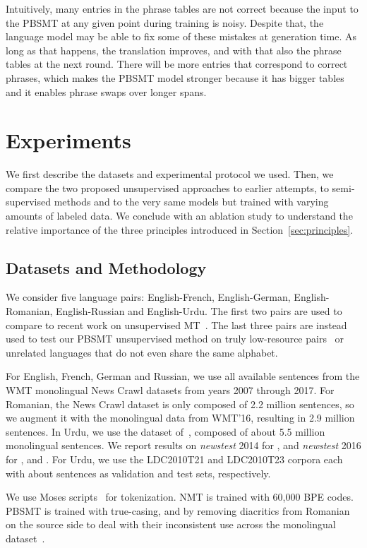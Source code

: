 \documentclass[11pt,a4paper]{article}
\begin{document}
Intuitively, many entries in the phrase tables are not correct because the input to the PBSMT at any given point during training is noisy. Despite that, the language model may be able to fix some of these mistakes at generation time. As long as that happens, the translation improves, and with that also the phrase tables at the next round. There will be more entries that correspond to correct phrases, which makes the PBSMT model stronger because it has bigger tables and it enables phrase swaps over longer spans.

\section{Experiments} \label{sec:experiments}
We first describe the datasets and experimental protocol we used. Then, we compare the two proposed unsupervised approaches to earlier attempts, to semi-supervised methods and to the very same models but trained with varying amounts of labeled data. We conclude with an ablation study to understand the relative importance of the three principles introduced in Section~\ref{sec:principles}.

\subsection{Datasets and Methodology} \label{sec:datasets}
We consider five language pairs: English-French, English-German, English-Romanian, English-Russian and English-Urdu. The first two pairs are used to compare to recent work on unsupervised MT~\cite{unsupNMTartetxe, unsupNMTlample}. The last three pairs are instead used to test our PBSMT unsupervised method on truly low-resource pairs~\cite{gu18} or unrelated languages that do not even share the same alphabet.

For English, French, German and Russian, we use all available sentences from the WMT monolingual News Crawl datasets from years 2007 through 2017. For Romanian, the News Crawl dataset is only composed of 2.2 million sentences, so we augment it with the monolingual data from WMT'16, resulting in 2.9 million sentences. In Urdu, we use the dataset of~\citet{jawaid2014tagged}, composed of about 5.5 million monolingual sentences. We report results on \textit{newstest} 2014 for , and \textit{newstest} 2016 for ,  and . For Urdu, we use the LDC2010T21 and LDC2010T23 corpora each with about  sentences as validation and test sets, respectively.

We use Moses scripts~\citep{moses} for tokenization. NMT is trained with 60,000 BPE codes. PBSMT is trained with true-casing, and by removing diacritics from Romanian on the source side to deal with their inconsistent use across the monolingual dataset~\cite{sennrich2016edinburgh}.
\end{document}
